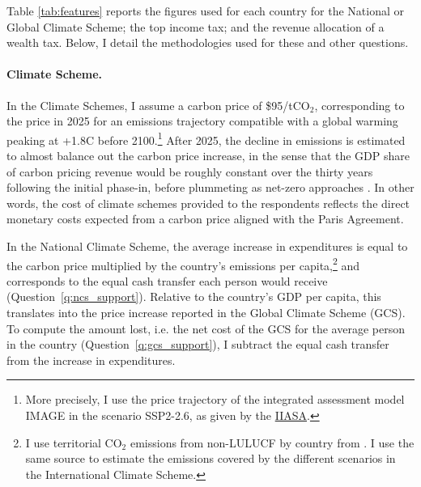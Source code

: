 \documentclass[12pt,english]{article}
\begin{document}
\begin{bibunit}
Table \ref{tab:features} reports the figures used for each country for the National or Global Climate Scheme; the top income tax; and the revenue allocation of a wealth tax. Below, I detail the methodologies used for these and other questions. 

\begin{table}[!h]
\caption[Country-specific features]{\hypertarget{tab_features}{Country-specific features of the questionnaire}.}\label{tab:features}
\makebox[\textwidth][c]{}
\end{table}

\paragraph{Climate Scheme.} 

In the Climate Schemes, I assume a carbon price of \$95/tCO$_\text{2}$, corresponding to the price in 2025 for an emissions trajectory compatible with a global warming peaking at +1.8\textdegree{}C before 2100.\footnote{More precisely, I use the price trajectory of the integrated assessment model IMAGE in the scenario SSP2-2.6, as given by the \href{https://secure.iiasa.ac.at/web-apps/ene/SspDb/download/iam_v2/SSP_IAM_V2_201811.csv.zip}{IIASA}.} 
After 2025, the decline in emissions is estimated to almost balance out the carbon price increase, in the sense that the GDP share of carbon pricing revenue would be roughly constant over the thirty years following the initial phase-in, before plummeting as net-zero approaches \citep{fabre_global_2024}. In other words, the cost of climate schemes provided to the respondents reflects the direct monetary costs expected from a carbon price aligned with the Paris Agreement.  

In the National Climate Scheme, the average increase in expenditures is equal to the carbon price multiplied by the country's emissions per capita,\footnote{I use territorial CO$_\text{2}$ emissions from non-LULUCF by country from \cite{gutschow_country-resolved_2021}. I use the same source to estimate the emissions covered by the different scenarios in the International Climate Scheme.} and corresponds to the equal cash transfer each person would receive (Question~\ref{q:ncs_support}). Relative to the country's GDP per capita, this translates into the price increase reported in the Global Climate Scheme (GCS). To compute the amount lost, i.e. the net cost of the GCS for the average person in the country (Question~\ref{q:gcs_support}), I subtract the equal cash transfer from the increase in expenditures. 


\end{bibunit}
\end{document}
